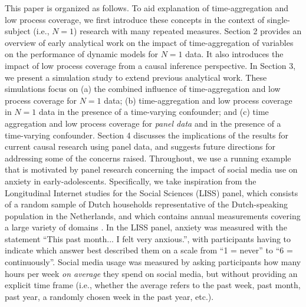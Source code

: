 \documentclass[man]{apa7} %
\begin{document}
This paper is organized as follows. To aid explanation of time-aggregation and low process coverage, we first introduce these concepts in the context of single-subject (i.e., $N = 1$) research with many repeated measures. Section 2 provides an overview of early analytical work on the impact of time-aggregation of variables on the performance of dynamic models for $N = 1$ data. It also introduces the impact of low process coverage from a causal inference perspective. In Section 3, we present a simulation study to extend previous analytical work. These simulations focus on (a) the combined influence of time-aggregation and low process coverage for $N = 1$ data; (b) time-aggregation and low process coverage in $N = 1$ data in the presence of a time-varying confounder; and (c) time aggregation and low process coverage for \textit{panel data} and in the presence of a time-varying confounder. Section 4 discusses the implications of the results for current causal research using panel data, and suggests future directions for addressing some of the concerns raised. Throughout, we use a running example that is motivated by panel research concerning the impact of social media use on anxiety in early-adolescents. Specifically, we take inspiration from the Longitudinal Internet studies for the Social Sciences (LISS) panel, which consists of a random sample of Dutch households representative of the Dutch-speaking population in the Netherlands, and which contains annual measurements covering a large variety of domains \parencite{das_true_2018}. In the LISS panel, anxiety was measured with the statement ``This past month... I felt very anxious.'', with participants having to indicate which answer best described them on a scale from ``1 = never'' to ``6 = continuously''. Social media usage was measured by asking participants how many hours per week \textit{on average} they spend on social media, but without providing an explicit time frame (i.e., whether the average refers to the past week, past month, past year, a randomly chosen week in the past year, etc.). 
\end{document}
